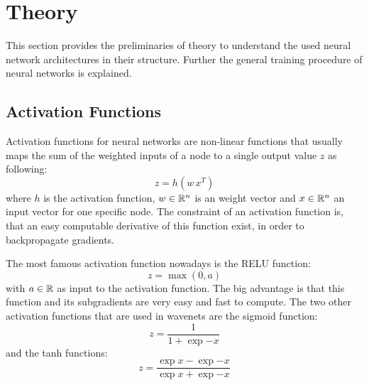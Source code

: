 
\section{Theory}\label{sec:nn_theory}
\thesisStateNotReady
This section provides the preliminaries of theory to understand the used neural network architectures in their structure. 
Further the general training procedure of neural networks is explained.


\subsection{Activation Functions}\label{sec:nn_theory_acti}
Activation functions for neural networks are non-linear functions that usually maps the sum of the weighted inputs of a node to a single output value $z$ as following:
\begin{equation}\label{eq:nn_theory_acti}
  z = h(w \, x^T)
\end{equation}
where $h$ is the activation function, $w \in \mathbb{R}^n$ is an weight vector and $x \in \mathbb{R}^n$ an input vector for one specific node.
The constraint of an activation function is, that an easy computable derivative of this function exist, in order to backpropagate gradients.

The most famous activation function nowadays is the RELU function:
\begin{equation}\label{eq:nn_theory_relu}
  z = \max{(0, a)}
\end{equation}
with $a \in \mathbb{R}$ as input to the activation function.
The big advantage is that this function and its subgradients are very easy and fast to compute.
The two other activation functions that are used in wavenets are the sigmoid function:
\begin{equation}\label{eq:nn_theory_sigmoid}
  z = \frac{1}{1 + \exp{-x}}
\end{equation}
and the tanh functions:
\begin{equation}\label{eq:nn_theory_tanh}
  z = \frac{\exp{x} - \exp{-x}}{\exp{x} + \exp{-x}}
\end{equation}





